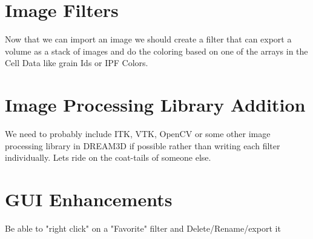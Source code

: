 \documentclass[12pt]{article} %
\begin{document}
\section{Image Filters}
   Now that we can import an image we should create a filter that can export a volume as a stack of images and do the coloring based on one of the arrays in the Cell Data like grain Ids or IPF Colors.

\section{Image Processing Library Addition}
   We need to probably include ITK, VTK, OpenCV or some other image processing library in DREAM3D if possible rather than writing each filter individually. Lets ride on the coat-tails of someone else.

\section{GUI Enhancements}
   Be able to "right click" on a "Favorite" filter and Delete/Rename/export it
   
\end{document}
